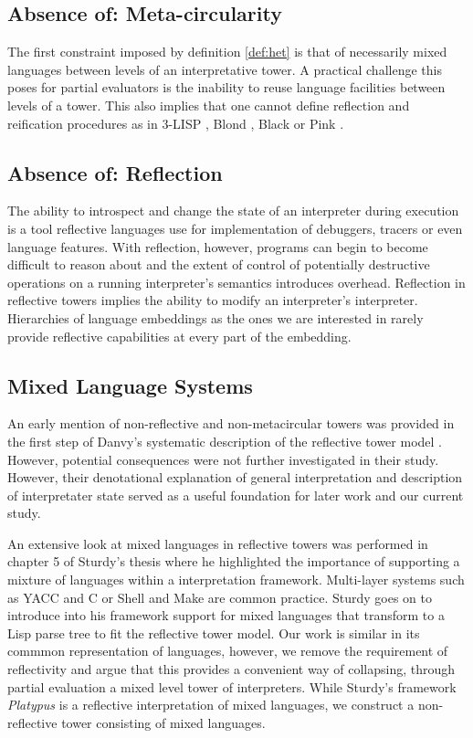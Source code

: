\documentclass[a4paper,12pt,twoside,openright]{report}
\theoremstyle{definition}
\begin{document}
\subsection{Absence of: Meta-circularity}
The first constraint imposed by definition \ref{def:het} is that of necessarily mixed languages between levels of an interpretative tower. A practical challenge this poses for partial evaluators is the inability to reuse language facilities between levels of a tower. This also implies that one cannot define reflection and reification procedures as in 3-LISP \cite{smith1984reflection}, Blond \cite{danvy1988intensions}, Black \cite{asai1996duplication} or Pink \cite{amin2017collapsing}.

\subsection{Absence of: Reflection}
The ability to introspect and change the state of an interpreter during execution is a tool reflective languages use for implementation of debuggers, tracers or even language features. With reflection, however, programs can begin to become difficult to reason about and the extent of control of potentially destructive operations on a running interpreter's semantics introduces overhead. Reflection in reflective towers implies the ability to modify an interpreter's interpreter. Hierarchies of language embeddings as the ones we are interested in rarely provide reflective capabilities at every part of the embedding.

\subsection{Mixed Language Systems}
An early mention of non-reflective and non-metacircular towers was provided in the first step of Danvy's systematic description of the reflective tower model \cite{danvy1988intensions}. However, potential consequences were not further investigated in their study. However, their denotational explanation of general interpretation and description of interpretater state served as a useful foundation for later work and our current study.

An extensive look at mixed languages in reflective towers was performed in chapter 5 of Sturdy's thesis \cite{sturdy1993lisp} where he highlighted the importance of supporting a mixture of languages within a interpretation framework. Multi-layer systems such as YACC and C or Shell and Make are common practice. Sturdy goes on to introduce into his framework support for mixed languages that transform to a Lisp parse tree to fit the reflective tower model. Our work is similar in its commmon representation of languages, however, we remove the requirement of reflectivity and argue that this provides a convenient way of collapsing, through partial evaluation a mixed level tower of interpreters. While Sturdy's framework \textit{Platypus} is a reflective interpretation of mixed languages, we construct a non-reflective tower consisting of mixed languages.
\end{document}

